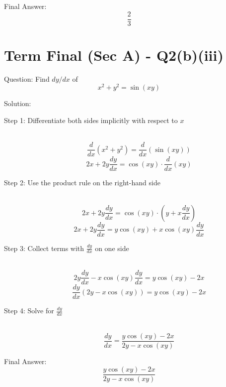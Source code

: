 \documentclass[11pt, a4paper]{article}
\begin{document}
Final Answer:
\[ 
\boxed{\frac{2}{3}} 
\]



\section*{Term Final (Sec A) - Q2(b)(iii)}

Question:
Find $dy/dx$ of 
\[ x^2 + y^2 = \sin(xy) \]

Solution:

\begin{description}
    \item[Step 1: Differentiate both sides implicitly with respect to $x$] \ \\
    \[ \frac{d}{dx}(x^2 + y^2) = \frac{d}{dx}(\sin(xy)) \]
    \[ 2x + 2y \frac{dy}{dx} = \cos(xy) \cdot \frac{d}{dx}(xy) \]

    \item[Step 2: Use the product rule on the right-hand side] \ \\
    \[ 2x + 2y \frac{dy}{dx} = \cos(xy) \cdot \left( y + x \frac{dy}{dx} \right) \]
    \[ 2x + 2y \frac{dy}{dx} = y\cos(xy) + x\cos(xy) \frac{dy}{dx} \]

    \item[Step 3: Collect terms with $\frac{dy}{dx}$ on one side] \ \\
    \[ 2y \frac{dy}{dx} - x\cos(xy) \frac{dy}{dx} = y\cos(xy) - 2x \]
    \[ \frac{dy}{dx} (2y - x\cos(xy)) = y\cos(xy) - 2x \]

    \item[Step 4: Solve for $\frac{dy}{dx}$] \ \\
    \[ \frac{dy}{dx} = \frac{y\cos(xy) - 2x}{2y - x\cos(xy)} \]
\end{description}

Final Answer:
\[ 
\boxed{\frac{y\cos(xy) - 2x}{2y - x\cos(xy)}} 
\]

\end{document}
